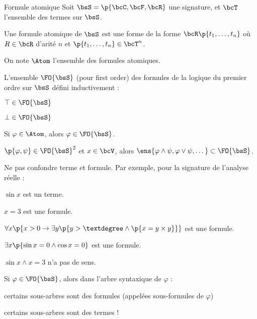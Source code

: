     \begin{definition}{Formule atomique}{}
        Soit $\bsS = \p{\bcC, \bcF, \bcR}$ une signature, et $\bcT$ l'ensemble des termes sur $\bsS$.
        
        Une formule atomique de $\bsS$ est une forme de la forme $\bcR\p{t_1, \dots, t_n}$ où $R \in \bcR$ d'arité $n$ et $\p{t_1, \dots, t_n} \in \bcT^n$.
    \end{definition}
    
    On note $\Atom$ l'ensemble des formules atomiques.
    
    L'ensemble $\FO{\bsS}$ (pour first order) des formules de la logique du premier ordre sur $\bsS$ défini inductivement :
    
    \begin{enumerate}
        \itast $\top \in \FO{\bsS}$ 
        
        \itast $\bot \in \FO{\bsS}$
        
        \itast Si $\varphi \in \Atom$, alors $\varphi \in \FO{\bsS}$.
        
        \itast $\p{\varphi, \psi} \in \FO{\bsS}^2$ et $x \in \bcV$, alors $\ens{\varphi \land \psi, \varphi \lor \psi, \dots } \subset \FO{\bsS}$.
    \end{enumerate}
    
    \begin{warning}{}{}
        Ne pas confondre terme et formule. Par exemple, pour la signature de l'analyse réelle :
        \begin{enumerate}
            \itt $\sin{x}$ est un terme.
            
            \itt $x = 3$ est une formule.
            
            \itt $\forall x \p{x > 0 \rightarrow \exists y \p{y > ° \land \p{x = y \times y}}}$ est une formule.
            
            \itt $\exists x \p{\sin x = 0 \land \cos x = 0}$ est une formule.
            
            \itt $\sin x \land x = 3$ n'a pas de sens.
        \end{enumerate}
    \end{warning}
    
    \begin{warning}{}{}
        Si $\varphi \in \FO{\bsS}$, alors dans l'arbre syntaxique de $\varphi$ :
        \begin{enumerate}
            \itt certains sous-arbres sont des formules (appelées sous-formules de $\varphi$)
            
            \itt certains sous-arbres sont des termes !
        \end{enumerate}
    \end{warning}
    
